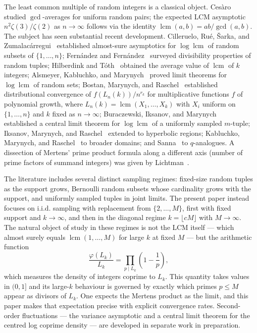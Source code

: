 \documentclass[11pt]{article}
\theoremstyle{remark}
\newcommand{\lcm}{\operatorname{lcm}}
\begin{document}
The least common multiple of random integers is a classical object. Ces\`aro~\cite{Cesaro1885} studied $\gcd$-averages for uniform random pairs; the expected LCM asymptotic $n^2 \zeta(3)/\zeta(2)$ as $n \to \infty$ follows via the identity $\lcm(a,b) = ab/\gcd(a,b)$. The subject has seen substantial recent development. Cilleruelo, Ru\'e, \v{S}arka, and Zumalac\'arregui~\cite{CilleruleoRueSarkaZumalacarregui2014} established almost-sure asymptotics for $\log \lcm$ of random subsets of $\{1, \ldots, n\}$; Fern\'andez and Fern\'andez~\cite{FernandezFernandez2021} surveyed divisibility properties of random tuples; Hilberdink and T\'oth~\cite{HilberdinkToth2016} obtained the average value of $\lcm$ of $k$ integers; Alsmeyer, Kabluchko, and Marynych~\cite{AlsmeyerKabluchkoMarynych2019} proved limit theorems for $\log \lcm$ of random sets; Bostan, Marynych, and Raschel~\cite{BostanMarynychRaschel2019} established distributional convergence of $f(L_n(k))/n^{r_k}$ for multiplicative functions $f$ of polynomial growth, where $L_n(k) = \lcm(X_1, \ldots, X_k)$ with $X_i$ uniform on $\{1, \ldots, n\}$ and $k$ fixed as $n \to \infty$; Buraczewski, Iksanov, and Marynych~\cite{BuraczewskiIksanovMarynych2022} established a central limit theorem for $\log \lcm$ of a uniformly sampled $m$-tuple; Iksanov, Marynych, and Raschel~\cite{IksanovMarynychRaschel2022} extended to hyperbolic regions; Kabluchko, Marynych, and Raschel~\cite{KabluchkoMarynychRaschel2023} to broader domains; and Sanna~\cite{Sanna2021} to $q$-analogues. A dissection of Mertens' prime product formula along a different axis (number of prime factors of summand integers) was given by Lichtman~\cite{Lichtman2021}.

The literature includes several distinct sampling regimes: fixed-size random tuples as the support grows, Bernoulli random subsets whose cardinality grows with the support, and uniformly sampled tuples in joint limits. The present paper instead focuses on i.i.d. sampling with replacement from $\{2, \ldots, M\}$, first with fixed support and $k \to \infty$, and then in the diagonal regime $k = \lfloor cM \rfloor$ with $M \to \infty$. The natural object of study in these regimes is not the LCM itself --- which almost surely equals $\lcm(1, \ldots, M)$ for large $k$ at fixed $M$ --- but the arithmetic function
\[
\frac{\varphi(L_k)}{L_k} = \prod_{p \mid L_k}\!\left(1 - \frac{1}{p}\right),
\]
which measures the density of integers coprime to $L_k$. This quantity takes values in $(0, 1]$ and its large-$k$ behaviour is governed by exactly which primes $p \leq M$ appear as divisors of $L_k$. One expects the Mertens product as the limit, and this paper makes that expectation precise with explicit convergence rates. Second-order fluctuations --- the variance asymptotic and a central limit theorem for the centred log coprime density --- are developed in separate work in preparation.
\end{document}
